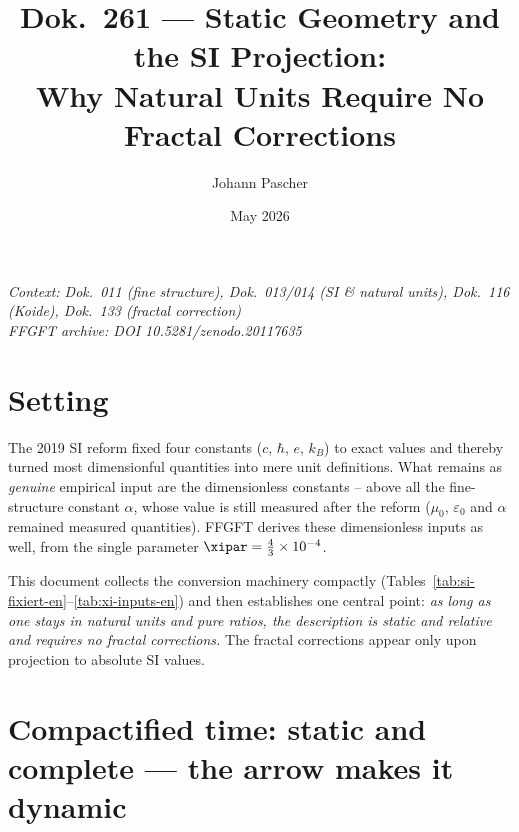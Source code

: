 
\title{Dok.~261 — Static Geometry and the SI Projection:\\
Why Natural Units Require No Fractal Corrections}
\author{Johann Pascher}
\date{May 2026}
\maketitle

\begin{center}
\textit{Context: Dok.~011 (fine structure), Dok.~013/014 (SI \& natural units),
Dok.~116 (Koide), Dok.~133 (fractal correction)} \\[2pt]
\textit{FFGFT archive: DOI 10.5281/zenodo.20117635}
\end{center}

\tableofcontents
\newpage

\section{Setting}

The 2019 SI reform fixed four constants ($c$, $\hbar$, $e$, $k_B$) to exact values
and thereby turned most dimensionful quantities into mere unit definitions. What
remains as \emph{genuine} empirical input are the dimensionless constants -- above
all the fine-structure constant $\alpha$, whose value is still measured after the
reform ($\mu_0$, $\varepsilon_0$ and $\alpha$ remained measured quantities). FFGFT
derives these dimensionless inputs as well, from the single parameter
$\xipar = \tfrac{4}{3}\times 10^{-4}$.

This document collects the conversion machinery compactly
(Tables~\ref{tab:si-fixiert-en}--\ref{tab:xi-inputs-en}) and then establishes one
central point: \emph{as long as one stays in natural units and pure ratios, the
description is static and relative and requires no fractal corrections.} The
fractal corrections appear only upon projection to absolute SI values.

\section{Compactified time: static and complete --- the arrow makes it dynamic}
\label{sec:rahmen}

